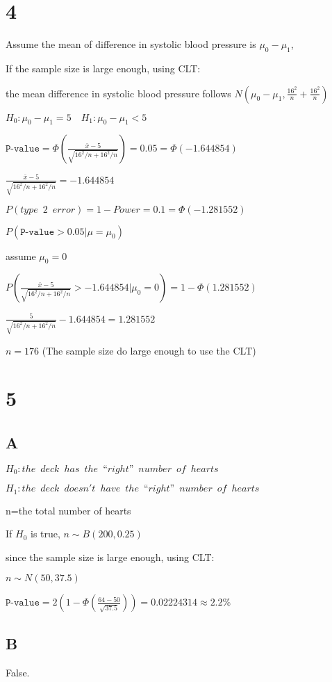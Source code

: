 \documentclass{article}
\begin{document}
\section*{4}
Assume the mean of difference in systolic blood pressure is $\mu_0-\mu_1$,

If the sample size is large enough, using CLT:

the mean difference in systolic blood pressure follows $N(\mu_0-\mu_1,\frac{16^2}{n}+\frac{16^2}{n})$

$H_0:\mu_0-\mu_1=5\quad H_1:\mu_0-\mu_1< 5$

$\texttt{P-value}=\Phi(\frac{\bar{x}-5}{\sqrt{16^2/n+16^2/n}})=0.05=\Phi(-1.644854)$

$\frac{\bar{x}-5}{\sqrt{16^2/n+16^2/n}}=-1.644854$

$P(type\enspace 2\enspace error)=1-Power=0.1=\Phi(-1.281552)$

$P(\texttt{P-value}>0.05|\mu=\mu_0)$

assume $\mu_0=0$

$P(\frac{\bar{x}-5}{\sqrt{16^2/n+16^2/n}}>-1.644854|\mu_0=0)=1-\Phi(1.281552)$

$\frac{5}{\sqrt{16^2/n+16^2/n}}-1.644854=1.281552$

$n=176$ (The sample size do large enough to use the CLT)




\section*{5}
\subsection*{A}
$H_0:the\enspace deck\enspace has\enspace the\enspace “right”\enspace number\enspace of\enspace hearts$

$H_1:the\enspace deck\enspace doesn't\enspace have\enspace the\enspace “right”\enspace number\enspace of\enspace hearts$

n=the total number of hearts

If $H_0$ is true, $n\sim B(200,0.25)$

since the sample size is large enough, using CLT:

$n\sim N(50,37.5)$

$\texttt{P-value}=2(1-\Phi(\frac{64-50}{\sqrt{37.5}}))=0.02224314\approx 2.2\%$

\subsection*{B}
False. 
\end{document}
